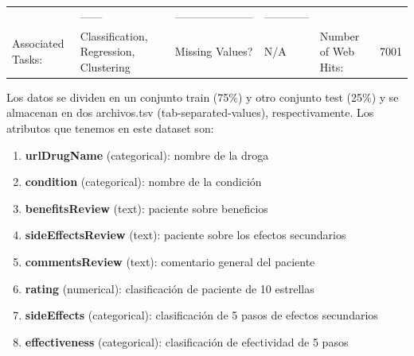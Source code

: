 \documentclass[spanish,]{article}
\providecommand{\tightlist}{%
  \setlength{\itemsep}{0pt}\setlength{\parskip}{0pt}}
\begin{document}
\begin{longtable}[]{@{}llllll@{}}
\begin{minipage}[t]{0.15\columnwidth}
\end{minipage} & \begin{minipage}[t]{0.04\columnwidth}\raggedright
------\strut
\end{minipage} & \begin{minipage}[t]{0.13\columnwidth}\raggedright
---------------------\strut
\end{minipage} & \begin{minipage}[t]{0.08\columnwidth}\raggedright
------------\strut
\end{minipage}\tabularnewline
\begin{minipage}[t]{0.18\columnwidth}\raggedright
Associated Tasks:\strut
\end{minipage} & \begin{minipage}[t]{0.26\columnwidth}\raggedright
Classification, Regression, Clustering\strut
\end{minipage} & \begin{minipage}[t]{0.15\columnwidth}\raggedright
Missing Values?\strut
\end{minipage} & \begin{minipage}[t]{0.04\columnwidth}\raggedright
N/A\strut
\end{minipage} & \begin{minipage}[t]{0.13\columnwidth}\raggedright
Number of Web Hits:\strut
\end{minipage} & \begin{minipage}[t]{0.08\columnwidth}\raggedright
7001\strut
\end{minipage}\tabularnewline
\bottomrule
\end{longtable}

Los datos se dividen en un conjunto train (75\%) y otro conjunto test
(25\%) y se almacenan en dos archivos.tsv (tab-separated-values),
respectivamente. Los atributos que tenemos en este dataset son:

\begin{enumerate}
\def\labelenumi{\arabic{enumi}.}
\tightlist
\item
  \textbf{urlDrugName} (categorical): nombre de la droga
\item
  \textbf{condition} (categorical): nombre de la condición
\item
  \textbf{benefitsReview} (text): paciente sobre beneficios
\item
  \textbf{sideEffectsReview} (text): paciente sobre los efectos
  secundarios
\item
  \textbf{commentsReview} (text): comentario general del paciente
\item
  \textbf{rating} (numerical): clasificación de paciente de 10 estrellas
\item
  \textbf{sideEffects} (categorical): clasificación de 5 pasos de
  efectos secundarios
\item
  \textbf{effectiveness} (categorical): clasificación de efectividad de
  5 pasos
\end{enumerate}
\end{document}
